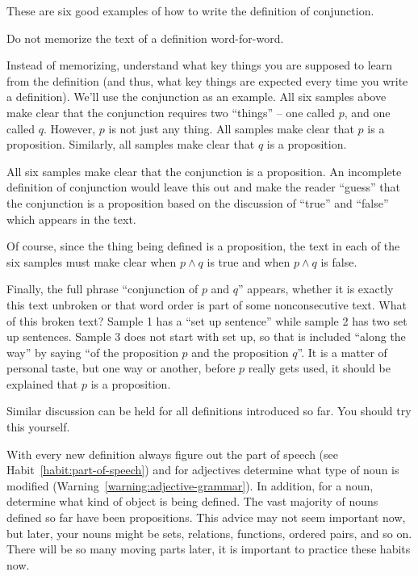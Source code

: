 \documentclass{book}
\theoremstyle{ekimcustom}
\begin{document}
These are six good examples of how to write the definition of conjunction.
\begin{bwarning}{}{}
Do not memorize the text of a definition word-for-word.
\end{bwarning}
Instead of memorizing, understand what key things you are supposed to learn from the definition (and thus, what key things are expected every time you write a definition). We'll use the conjunction as an example. All six samples above make clear that the conjunction requires two ``things'' -- one called $p$, and one called $q$. However, $p$ is not just any thing. All samples make clear that $p$ is a proposition. Similarly, all samples make clear that $q$ is a proposition.

All six samples make clear that the conjunction is a proposition. An incomplete definition of conjunction would leave this out and make the reader ``guess'' that the conjunction is a proposition based on the discussion of ``true'' and ``false'' which appears in the text.

Of course, since the thing being defined is a proposition, the text in each of the six samples must make clear when $p \wedge q$ is true and when $p \wedge q$ is false.

Finally, the full phrase ``conjunction of $p$ and $q$'' appears, whether it is exactly this text unbroken or that word order is part of some nonconsecutive text. What of this broken text? Sample 1 has a ``set up sentence'' while sample 2 has two set up sentences. Sample 3 does not start with set up, so that is included ``along the way'' by saying ``of the proposition $p$ and the proposition $q$''. It is a matter of personal taste, but one way or another, before $p$ really gets used, it should be explained that $p$ is a proposition.

Similar discussion can be held for all definitions introduced so far. You should try this yourself.

With every new definition always figure out the part of speech (see Habit~\ref{habit:part-of-speech}) and for adjectives determine what type of noun is modified (Warning~\ref{warning:adjective-grammar}). In addition, for a noun, determine what kind of object is being defined. The vast majority of nouns defined so far have been propositions. This advice may not seem important now, but later, your nouns might be sets, relations, functions, ordered pairs, and so on. There will be so many moving parts later, it is important to practice these habits now.
\end{document}
